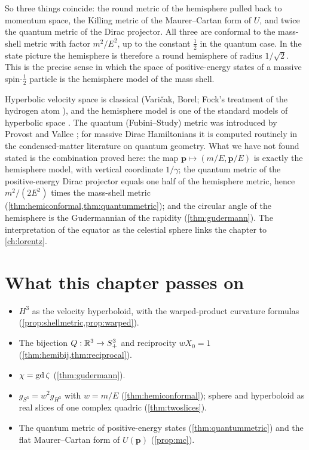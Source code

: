 So three things coincide: the round metric of the hemisphere pulled back to momentum space, the Killing metric of the Maurer--Cartan form of $U$, and twice the quantum metric of the Dirac projector. All three are conformal to the mass-shell metric with factor $m^2/E^2$, up to the constant $\frac12$ in the quantum case. In the state picture the hemisphere is therefore a round hemisphere of radius $1/\sqrt2$. This is the precise sense in which the space of positive-energy states of a massive spin-$\frac12$ particle is the hemisphere model of the mass shell.

\begin{litbox}
Hyperbolic velocity space is classical (Vari\v{c}ak, Borel; Fock's treatment of the hydrogen atom \cite{Fock1935}), and the hemisphere model is one of the standard models of hyperbolic space \cite{CFKP}. The quantum (Fubini--Study) metric was introduced by Provost and Vallee \cite{ProvostVallee1980}; for massive Dirac Hamiltonians it is computed routinely in the condensed-matter literature on quantum geometry. What we have not found stated is the combination proved here: the map $\mathbf p\mapsto(m/E,\mathbf p/E)$ is exactly the hemisphere model, with vertical coordinate $1/\gamma$; the quantum metric of the positive-energy Dirac projector equals one half of the hemisphere metric, hence $m^2/(2E^2)$ times the mass-shell metric (\cref{thm:hemiconformal,thm:quantummetric}); and the circular angle of the hemisphere is the Gudermannian of the rapidity (\cref{thm:gudermann}). The interpretation of the equator as the celestial sphere links the chapter to \cref{ch:lorentz}.
\end{litbox}

\section*{What this chapter passes on}
\begin{itemize}[nosep]
\item $H^3$ as the velocity hyperboloid, with the warped-product curvature formulas (\cref{prop:shellmetric,prop:warped}).
\item The bijection $Q:\mathbb{R}^3\to S^3_+$ and reciprocity $wX_0=1$ (\cref{thm:hemibij,thm:reciprocal}).
\item $\chi=\operatorname{gd}\zeta$ (\cref{thm:gudermann}).
\item $g_{S^3}=w^2g_{H^3}$ with $w=m/E$ (\cref{thm:hemiconformal}); sphere and hyperboloid as real slices of one complex quadric (\cref{thm:twoslices}).
\item The quantum metric of positive-energy states (\cref{thm:quantummetric}) and the flat Maurer--Cartan form of $U(\mathbf p)$ (\cref{prop:mc}).
\end{itemize}

